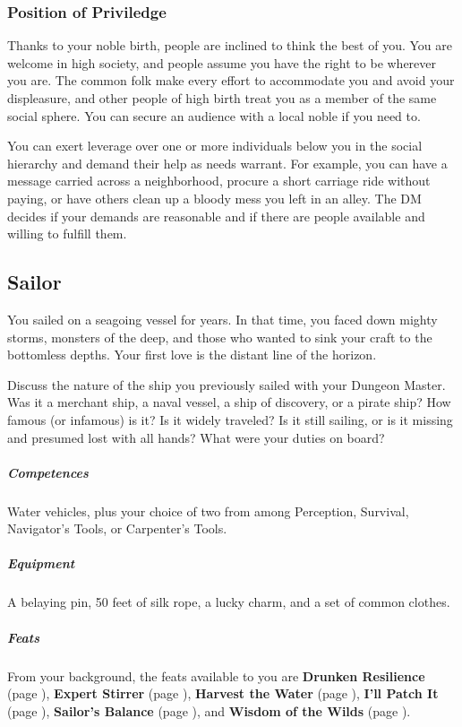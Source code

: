     \subsubsection{Position of Priviledge}
        Thanks to your noble birth, people are inclined to think the best of you.
        You are welcome in high society, and people assume you have the right to be wherever you are.
        The common folk make every effort to accommodate you and avoid your displeasure, and other people of high birth treat you as a member of the same social sphere.
        You can secure an audience with a local noble if you need to.

        You can exert leverage over one or more individuals below you in the social hierarchy and demand their help as needs warrant.
        For example, you can have a message carried across a neighborhood, procure a short carriage ride without paying, or have others clean up a bloody mess you left in an alley.
        The DM decides if your demands are reasonable and if there are people available and willing to fulfill them.

\subsection*{Sailor} \label{ssec::sailor}
    You sailed on a seagoing vessel for years.
    In that time, you faced down mighty storms, monsters of the deep, and those who wanted to sink your craft to the bottomless depths.
    Your first love is the distant line of the horizon.

    Discuss the nature of the ship you previously sailed with your Dungeon Master.
    Was it a merchant ship, a naval vessel, a ship of discovery, or a pirate ship?
    How famous (or infamous) is it?
    Is it widely traveled?
    Is it still sailing, or is it missing and presumed lost with all hands?
    What were your duties on board?

    \subparagraph{Competences} Water vehicles, plus your choice of two from among Perception, Survival, Navigator's Tools, or Carpenter's Tools.

    \subparagraph{Equipment} A belaying pin, 50 feet of silk rope, a lucky charm, and a set of common clothes.

    \subparagraph{Feats} From your background, the feats available to you are
    \textbf{Drunken Resilience} (page \pageref{feat::drunkenresilience}),
    \textbf{Expert Stirrer} (page \pageref{feat::expertstirrer}),
    \textbf{Harvest the Water} (page \pageref{feat::harvestthewater}),
    \textbf{I'll Patch It} (page \pageref{feat::illpatchit}),
    \textbf{Sailor's Balance} (page \pageref{feat::sailorsbalance}), and
    \textbf{Wisdom of the Wilds} (page \pageref{feat::wisdomofthewilds}).

